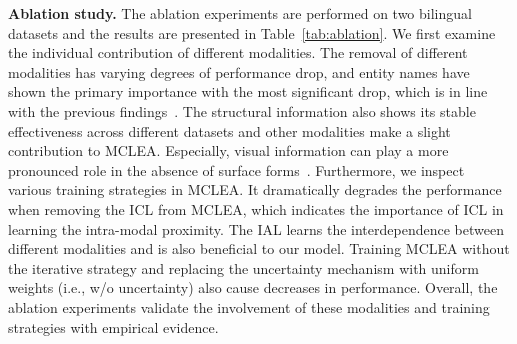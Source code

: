 \documentclass[11pt]{article}
\begin{document}
\noindent\textbf{Ablation study.}
The ablation experiments are performed on two bilingual datasets and the results are presented in Table~\ref{tab:ablation}.
We first examine the individual contribution of different modalities.
The removal of different modalities has varying degrees of performance drop, and entity names have shown the primary importance with the most significant drop, which is in line with the previous findings~\cite{mao2020mraea,ge2021make}.
The structural information also shows its stable effectiveness across different datasets and other modalities make a slight contribution to MCLEA. Especially, visual information can play a more pronounced role in the absence of surface forms~\cite{chen2020mmea, liu2021visual}.
Furthermore, we inspect various training strategies in MCLEA.
It dramatically degrades the performance when removing the ICL from MCLEA, which indicates the importance of ICL in learning the intra-modal proximity.
The IAL learns the interdependence between different modalities and is also beneficial to our model.
Training MCLEA without the iterative strategy and replacing the uncertainty mechanism with uniform weights (i.e., w/o uncertainty) also cause decreases in performance.
Overall, the ablation experiments validate the involvement of these modalities and training strategies with empirical evidence.
\end{document}
